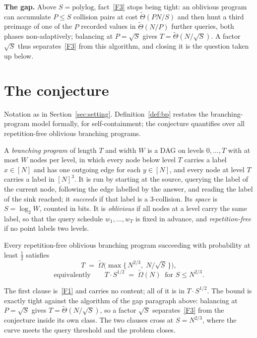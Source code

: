 \documentclass{conjura-conjecture}
\newcommand{\NN}{[N]}
\begin{document}
\smallskip
\noindent\textbf{The gap.}
Above $S = \mathrm{polylog}$, fact~\ref{F3} stops being tight: an oblivious program can
accumulate $P \leq S$ collision pairs at cost $\tilde\Theta(PN/S)$ and then hunt a third preimage
of one of the $P$ recorded values in $\tilde\Theta(N/P)$ further queries, both phases
non-adaptively; balancing at $P = \sqrt S$ gives $T = \tilde\Theta(N/\sqrt S)$.  A factor
$\sqrt S$ thus separates~\ref{F3} from this algorithm, and closing it is the question taken up
below.

\section{The conjecture}\label{sec:conjecture}

Notation as in Section~\ref{sec:setting}.  Definition~\ref{def:bp} restates the branching-program
model formally, for self-containment; the conjecture quantifies over all repetition-free
oblivious branching programs.

\begin{definition}\label{def:bp}
A \emph{branching program} of length $T$ and width $W$ is a DAG on levels $0,\dots,T$ with at
most $W$ nodes per level, in which every node below level $T$ carries a label $x \in \NN$ and has
one outgoing edge for each $y \in \NN$, and every node at level $T$ carries a label in $\NN^{3}$.
It is run by starting at the source, querying the label of the current node, following the edge
labelled by the answer, and reading the label of the sink reached; it \emph{succeeds} if that
label is a $3$-collision.  Its \emph{space} is $S = \log_{2} W$, counted in bits.  It is
\emph{oblivious} if all nodes at a level carry the same label, so that the query schedule
$w_{1},\dots,w_{T}$ is fixed in advance, and \emph{repetition-free} if no point labels two
levels.
\end{definition}

\begin{conjecture}[BS0$^{+}$: the oblivious sequential curve at $k=3$]\label{conj:main}
Every repetition-free oblivious branching program succeeding with probability at least $\tfrac12$
satisfies
\[
  T \;=\; \tilde\Omega\bigl(\max\{\, N^{2/3},\; N/\sqrt{S} \,\}\bigr),
\]
\[
  \text{equivalently} \qquad
  T \cdot S^{1/2} \;=\; \tilde\Omega(N) \ \text{ for } S \leq N^{2/3}.
\]
\end{conjecture}

\begin{remark}\label{rem:tightness}
The first clause is~\ref{F1} and carries no content; all of it is in $T \cdot S^{1/2}$.  The
bound is exactly tight against the algorithm of the gap paragraph above: balancing at
$P = \sqrt S$ gives $T = \tilde\Theta(N/\sqrt S)$, so a factor $\sqrt S$ separates~\ref{F3} from
the conjecture inside its own class.  The two clauses cross at $S = N^{2/3}$, where the curve
meets the query threshold and the problem closes.
\end{remark}
\end{document}
